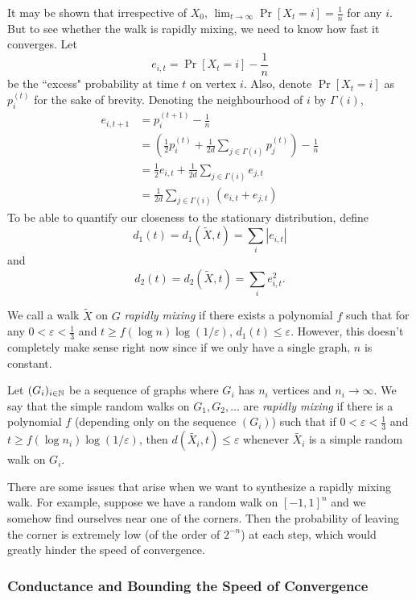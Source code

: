 It may be shown that irrespective of $X_0$, $\lim_{t\to\infty}\Pr[X_t=i] = \frac{1}{n}$ for any $i$. But to see whether the walk is rapidly mixing, we need to know how fast it converges. Let
\[ e_{i,t} = \Pr[X_t=i] - \frac{1}{n} \]
be the ``excess" probability at time $t$ on vertex $i$. Also, denote $\Pr[X_t=i]$ as $p_i^{(t)}$ for the sake of brevity. Denoting the neighbourhood of $i$ by $\Gamma(i)$,
\begin{align}
	e_{i,t+1} &= p_i^{(t+1)} - \frac{1}{n} \nonumber \\
	&= \left(\frac{1}{2}p_i^{(t)} + \frac{1}{2d}\sum_{j\in\Gamma(i)}p_j^{(t)}\right) - \frac{1}{n} \nonumber \\
	&= \frac{1}{2}e_{i,t} + \frac{1}{2d}\sum_{j\in\Gamma(i)}e_{j,t} \nonumber \\
	&= \frac{1}{2d} \sum_{j\in\Gamma(i)}(e_{i,t}+e_{j,t}) \label{eqn: alternate expression for future error}
\end{align}
To be able to quantify our closeness to the stationary distribution, define
\[d_1(t)=d_1(\tilde{X},t) = \sum_{i}|e_{i,t}|\]
and
\[d_2(t)=d_2(\tilde{X},t) = \sum_{i}e_{i,t}^2.\]

We call a walk $\tilde{X}$ on $G$ \textit{rapidly mixing} if there exists a polynomial $f$ such that for any $0<\varepsilon<\frac{1}{3}$ and $t\geq f(\log n)\log(1/\varepsilon)$, $d_1(t)\leq\varepsilon$. However, this doesn't completely make sense right now since if we only have a single graph, $n$ is constant.

\begin{fdef}
\label{def: rapidly mixing random walks}
	Let $(G_i)_{i\in\mathbb{N}}$ be a sequence of graphs where $G_i$ has $n_i$ vertices and $n_i\to\infty$. We say that the simple random walks on $G_1,G_2,\ldots$ are \textit{rapidly mixing} if there is a polynomial $f$ (depending only on the sequence $(G_i)$) such that if $0<\varepsilon<\frac{1}{3}$ and $t\geq f(\log n_i)\log(1/\varepsilon)$, then $d(\tilde{X_i},t)\leq\varepsilon$ whenever $\tilde{X_i}$ is a simple random walk on $G_i$.
\end{fdef}

There are some issues that arise when we want to synthesize a rapidly mixing walk. For example, suppose we have a random walk on $[-1,1]^n$ and we somehow find ourselves near one of the corners. Then the probability of leaving the corner is extremely low (of the order of $2^{-n}$) at each step, which would greatly hinder the speed of convergence.

\subsubsection{Conductance and Bounding the Speed of Convergence}

